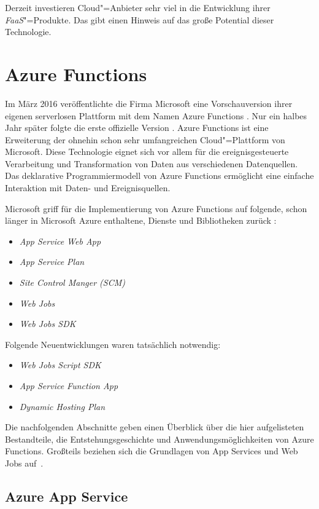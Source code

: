 Derzeit investieren Cloud"=Anbieter sehr viel in die Entwicklung ihrer \textit{FaaS}"=Produkte. Das gibt einen Hinweis auf das große Potential dieser Technologie.

\section{Azure Functions}

Im März 2016 veröffentlichte die Firma Microsoft eine Vorschauversion ihrer eigenen serverlosen Plattform mit dem Namen Azure Functions \cite{AzFunIntro}. Nur ein halbes Jahr später folgte die erste offizielle Version \cite{AzFunGA}. Azure  Functions ist eine Erweiterung der ohnehin schon sehr umfangreichen Cloud"=Plattform von Microsoft. Diese Technologie eignet sich vor allem für die ereignisgesteuerte Verarbeitung und Transformation von Daten aus verschiedenen Datenquellen. Das deklarative Programmiermodell von Azure Functions ermöglicht eine einfache Interaktion mit Daten- und Ereignisquellen. 

Microsoft griff für die Implementierung von Azure Functions auf folgende, schon länger in Microsoft Azure enthaltene, Dienste und Bibliotheken zurück \cite{AzFunJourney}:

\begin{itemize}
	\item \textit{App Service Web App}
	\item \textit{App Service Plan}
	\item \textit{Site Control Manger (SCM)}
	\item \textit{Web Jobs}
	\item \textit{Web Jobs SDK}
\end{itemize}
Folgende Neuentwicklungen waren tatsächlich notwendig:
\begin{itemize}
	\item \textit{Web Jobs Script SDK}
	\item \textit{App Service Function App}
	\item \textit{Dynamic Hosting Plan}
\end{itemize}

Die nachfolgenden Abschnitte geben einen Überblick über die hier aufgelisteten Bestandteile, die Entstehungsgeschichte und Anwendungsmöglichkeiten von Azure Functions. Großteils beziehen sich die Grundlagen von App Services und Web Jobs auf~\cite{AzWebEssentials4Devs}.

\subsection{Azure App Service}

